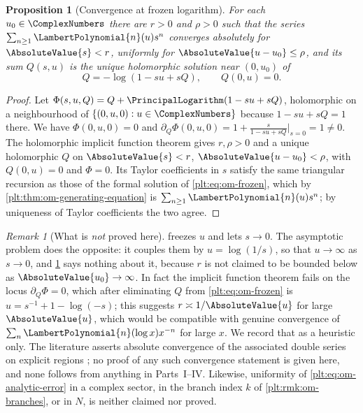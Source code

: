 \documentclass[11pt,oneside]{article}
\theoremstyle{plain}
\newtheorem{proposition}[theorem]{Proposition}
\theoremstyle{definition}
\theoremstyle{remark}
\newtheorem{remark}[theorem]{Remark}
\newcommand{\LamP}[1]{\LambertPolynomial{#1}}
\begin{document}
\begin{proposition}[Convergence at frozen logarithm]
\label{plt:prop:om-frozen-convergence}
For each \(u_0\in\ComplexNumbers\) there are \(r>0\) and \(\rho>0\) such that
the series \(\sum_{n\ge1}\LamP{n}(u)s^{n}\) converges absolutely for
\(\AbsoluteValue{s}<r\), uniformly for
\(\AbsoluteValue{u-u_0}\le\rho\), and its sum \(Q(s,u)\) is the unique
holomorphic solution near \((0,u_0)\) of
\begin{equation}\label{plt:eq:om-frozen}
 Q=-\log(1-su+sQ),\qquad Q(0,u)=0 .
\end{equation}
\end{proposition}

\begin{proof}
Let \(\Phi(s,u,Q)=Q+\PrincipalLogarithm(1-su+sQ)\), holomorphic on a
neighbourhood of \(\{(0,u,0):u\in\ComplexNumbers\}\) because
\(1-su+sQ=1\) there.  We have \(\Phi(0,u,0)=0\) and
\(\partial_Q\Phi(0,u,0)=1+\frac{s}{1-su+sQ}\big|_{s=0}=1\ne0\).  The
holomorphic implicit function theorem gives \(r,\rho>0\) and a unique
holomorphic \(Q\) on \(\AbsoluteValue{s}<r\),
\(\AbsoluteValue{u-u_0}<\rho\), with \(Q(0,u)=0\) and \(\Phi=0\).  Its Taylor
coefficients in \(s\) satisfy the same triangular recursion as those of the
formal solution of \eqref{plt:eq:om-frozen}, which by
\cref{plt:thm:om-generating-equation} is
\(\sum_{n\ge1}\LamP{n}(u)s^{n}\); by uniqueness of Taylor coefficients the
two agree.
\end{proof}

\begin{remark}[What is \emph{not} proved here]
\label{plt:rmk:om-open}
 freezes \(u\) and lets \(s\to0\).  The
asymptotic problem does the opposite: it couples them by \(u=\log(1/s)\), so
that \(u\to\infty\) as \(s\to0\), and \cref{plt:prop:om-frozen-convergence}
says nothing about it, because \(r\) is not claimed to be bounded below as
\(\AbsoluteValue{u_0}\to\infty\).  In fact the implicit function theorem
fails on the locus \(\partial_Q\Phi=0\), which after eliminating \(Q\) from
\eqref{plt:eq:om-frozen} is \(u=s^{-1}+1-\log(-s)\); this suggests
\(r\asymp1/\AbsoluteValue{u}\) for large \(\AbsoluteValue{u}\), which would
be compatible with genuine convergence of
\(\sum_n\LamP{n}(\log x)x^{-n}\) for large \(x\).  We record that as a
heuristic only.  The literature asserts absolute convergence of the
associated double series on explicit regions
\cite{corless-et-al-1996,jeffrey-et-al-1995,dlmf-W}; no proof of any such
convergence statement is given here, and none follows from anything in
Parts~I--IV.  Likewise, uniformity of \eqref{plt:eq:om-analytic-error} in a
complex sector, in the branch index \(k\) of \cref{plt:rmk:om-branches}, or
in \(N\), is neither claimed nor proved.
\end{remark}
\end{document}
